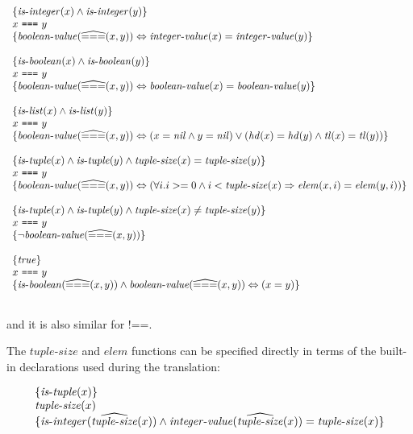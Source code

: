 \[
\begin{array}{l}
\{ \mathit{is\mbox{-}integer}(x) \wedge \mathit{is\mbox{-}integer}(y) \}\\
x~\texttt{===}~y\\
\{ \mathit{boolean\mbox{-}value}(\widehat{===}(x, y)) \Leftrightarrow \mathit{integer\mbox{-}value}(x) = \mathit{integer\mbox{-}value}(y) \}\\
\\
\{ \mathit{is\mbox{-}boolean}(x) \wedge \mathit{is\mbox{-}boolean}(y) \}\\
x~\texttt{===}~y\\
\{ \mathit{boolean\mbox{-}value}(\widehat{===}(x, y)) \Leftrightarrow \mathit{boolean\mbox{-}value}(x) = \mathit{boolean\mbox{-}value}(y) \}\\
\\
\{ \mathit{is\mbox{-}list}(x) \wedge \mathit{is\mbox{-}list}(y) \}\\
x~\texttt{===}~y\\
\{ \mathit{boolean\mbox{-}value}(\widehat{===}(x, y)) \Leftrightarrow 
  (x = \mathit{nil} \wedge y = \mathit{nil})
  \vee (\mathit{hd}(x) = \mathit{hd}(y) \land \mathit{tl}(x) = \mathit{tl}(y)) \}\\
\\
\{ \mathit{is\mbox{-}tuple}(x) \wedge \mathit{is\mbox{-}tuple}(y) \wedge \mathit{tuple\mbox{-}size}(x) = \mathit{tuple\mbox{-}size}(y) \}\\
x~\texttt{===}~y\\
\{ \mathit{boolean\mbox{-}value}(\widehat{===}(x, y)) \Leftrightarrow 
  (\forall i. i >= 0 \wedge i < \mathit{tuple\mbox{-}size}(x) \Rightarrow \mathit{elem}(x, i) = \mathit{elem}(y, i)) \}\\
\\
\{ \mathit{is\mbox{-}tuple}(x) \wedge \mathit{is\mbox{-}tuple}(y) \wedge \mathit{tuple\mbox{-}size}(x) \neq \mathit{tuple\mbox{-}size}(y) \}\\
x~\texttt{===}~y\\
\{ \neg\mathit{boolean\mbox{-}value}(\widehat{===}(x, y)) \}\\
\\
\{\mathit{true}\}\\
x~\texttt{===}~y\\
\{ \mathit{is\mbox{-}boolean}(\widehat{===}(x, y)) \wedge \mathit{boolean\mbox{-}value}(\widehat{===}(x, y)) \Leftrightarrow (x = y) \}\\
\\
\end{array}
\]

and it is also similar for $\texttt{!==}$.

The $\mathit{tuple\mbox{-}size}$ and $\mathit{elem}$ functions can be specified directly 
in terms of the built-in declarations used during the translation:

\[
\begin{array}{l}
\{ \mathit{is\mbox{-}tuple}(x) \}\\
\mathit{tuple\mbox{-}size}(x)\\
\{ \mathit{is\mbox{-}integer}(\widehat{\mathit{tuple\mbox{-}size}}(x)) \wedge 
  \mathit{integer\mbox{-}value}(\widehat{\mathit{tuple\mbox{-}size}}(x)) = \mathit{tuple\mbox{-}size}(x) \}
\end{array}
\]

